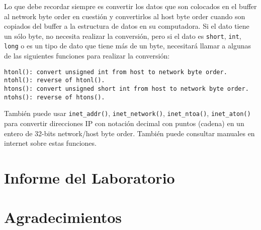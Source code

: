 Lo que debe recordar siempre es convertir los datos que son colocados en el buffer al network byte order en cuestión y convertirlos al host byte order cuando son copiados del buffer a la estructura de datos en su computadora. Si el dato tiene un sólo byte, no necesita realizar la conversión, pero si el dato es {\tt short}, 
{\tt int}, {\tt long} o es un tipo de dato que tiene más de un byte, necesitará llamar a algunas de las siguientes funciones para realizar la conversión:

\begin{lstlisting}
htonl(): convert unsigned int from host to network byte order.
ntohl(): reverse of htonl().
htons(): convert unsigned short int from host to network byte order.
ntohs(): reverse of htons().
\end{lstlisting}


También puede usar {\tt inet\_addr()}, {\tt inet\_network()},
{\tt inet\_ntoa()}, {\tt inet\_aton()} para convertir direcciones IP con notación decimal con puntos (cadena) en un entero de 32-bits network/host byte order. También puede consultar manuales en internet sobre estas funciones.

\section{Informe del Laboratorio}



\section{Agradecimientos}








